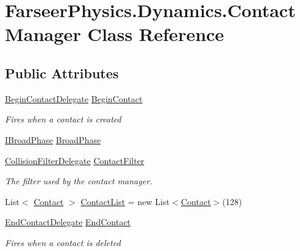 \hypertarget{class_farseer_physics_1_1_dynamics_1_1_contact_manager}{\section{Farseer\+Physics.\+Dynamics.\+Contact\+Manager Class Reference}
\label{class_farseer_physics_1_1_dynamics_1_1_contact_manager}
}
\subsection*{Public Attributes}
\begin{DoxyCompactItemize}
\item 
\hyperlink{namespace_farseer_physics_1_1_dynamics_a99b82c4cad7efb4a314b7683e1e5b9f5}{Begin\+Contact\+Delegate} \hyperlink{class_farseer_physics_1_1_dynamics_1_1_contact_manager_abd5fb7b5dff0a2e01b0be2877de80350}{Begin\+Contact}
\begin{DoxyCompactList}\small\item\em Fires when a contact is created \end{DoxyCompactList}\item 
\hyperlink{interface_farseer_physics_1_1_collision_1_1_i_broad_phase}{I\+Broad\+Phase} \hyperlink{class_farseer_physics_1_1_dynamics_1_1_contact_manager_a47a1174657d443ef517040a277d77d66}{Broad\+Phase}
\item 
\hyperlink{namespace_farseer_physics_1_1_dynamics_a0c43ff149e8b9f3224e7f5dd805281b2}{Collision\+Filter\+Delegate} \hyperlink{class_farseer_physics_1_1_dynamics_1_1_contact_manager_a7f9c9d37668f518aca09b00059848c52}{Contact\+Filter}
\begin{DoxyCompactList}\small\item\em The filter used by the contact manager. \end{DoxyCompactList}\item 
List$<$ \hyperlink{class_farseer_physics_1_1_dynamics_1_1_contacts_1_1_contact}{Contact} $>$ \hyperlink{class_farseer_physics_1_1_dynamics_1_1_contact_manager_a80afa04c72f22f1d842f551583fa5f3d}{Contact\+List} = new List$<$\hyperlink{class_farseer_physics_1_1_dynamics_1_1_contacts_1_1_contact}{Contact}$>$(128)
\item 
\hyperlink{namespace_farseer_physics_1_1_dynamics_a9f14bccf84c77834b2365a50815aaad2}{End\+Contact\+Delegate} \hyperlink{class_farseer_physics_1_1_dynamics_1_1_contact_manager_a66735087affa148b5ffb1622eab07cf5}{End\+Contact}
\begin{DoxyCompactList}\small\item\em Fires when a contact is deleted \end{DoxyCompactList}\item 

\end{DoxyCompactItemize}
